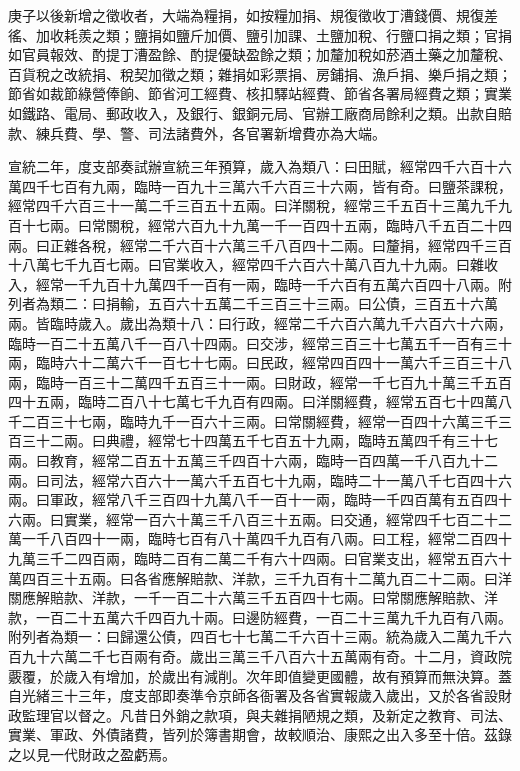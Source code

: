 \begin{pinyinscope}
庚子以後新增之徵收者，大端為糧捐，如按糧加捐、規復徵收丁漕錢價、規復差徭、加收耗羨之類；鹽捐如鹽斤加價、鹽引加課、土鹽加稅、行鹽口捐之類；官捐如官員報效、酌提丁漕盈餘、酌提優缺盈餘之類；加釐加稅如菸酒土藥之加釐稅、百貨稅之改統捐、稅契加徵之類；雜捐如彩票捐、房鋪捐、漁戶捐、樂戶捐之類；節省如裁節綠營俸餉、節省河工經費、核扣驛站經費、節省各署局經費之類；實業如鐵路、電局、郵政收入，及銀行、銀銅元局、官辦工廠商局餘利之類。出款自賠款、練兵費、學、警、司法諸費外，各官署新增費亦為大端。

宣統二年，度支部奏試辦宣統三年預算，歲入為類八：曰田賦，經常四千六百十六萬四千七百有九兩，臨時一百九十三萬六千六百三十六兩，皆有奇。曰鹽茶課稅，經常四千六百三十一萬二千三百五十五兩。曰洋關稅，經常三千五百十三萬九千九百十七兩。曰常關稅，經常六百九十九萬一千一百四十五兩，臨時八千五百二十四兩。曰正雜各稅，經常二千六百十六萬三千八百四十二兩。曰釐捐，經常四千三百十八萬七千九百七兩。曰官業收入，經常四千六百六十萬八百九十九兩。曰雜收入，經常一千九百十九萬四千一百有一兩，臨時一千六百有五萬六百四十八兩。附列者為類二：曰捐輸，五百六十五萬二千三百三十三兩。曰公債，三百五十六萬兩。皆臨時歲入。歲出為類十八：曰行政，經常二千六百六萬九千六百六十六兩，臨時一百二十五萬八千一百八十四兩。曰交涉，經常三百三十七萬五千一百有三十兩，臨時六十二萬六千一百七十七兩。曰民政，經常四百四十一萬六千三百三十八兩，臨時一百三十二萬四千五百三十一兩。曰財政，經常一千七百九十萬三千五百四十五兩，臨時二百八十七萬七千九百有四兩。曰洋關經費，經常五百七十四萬八千二百三十七兩，臨時九千一百六十三兩。曰常關經費，經常一百四十六萬三千三百三十二兩。曰典禮，經常七十四萬五千七百五十九兩，臨時五萬四千有三十七兩。曰教育，經常二百五十五萬三千四百十六兩，臨時一百四萬一千八百九十二兩。曰司法，經常六百六十一萬六千五百七十九兩，臨時二十一萬八千七百四十六兩。曰軍政，經常八千三百四十九萬八千一百十一兩，臨時一千四百萬有五百四十六兩。曰實業，經常一百六十萬三千八百三十五兩。曰交通，經常四千七百二十二萬一千八百四十一兩，臨時七百有八十萬四千九百有八兩。曰工程，經常二百四十九萬三千二四百兩，臨時二百有二萬二千有六十四兩。曰官業支出，經常五百六十萬四百三十五兩。曰各省應解賠款、洋款，三千九百有十二萬九百二十二兩。曰洋關應解賠款、洋款，一千一百二十六萬三千五百四十七兩。曰常關應解賠款、洋款，一百二十五萬六千四百九十兩。曰邊防經費，一百二十三萬九千九百有八兩。附列者為類一：曰歸還公債，四百七十七萬二千六百十三兩。統為歲入二萬九千六百九十六萬二千七百兩有奇。歲出三萬三千八百六十五萬兩有奇。十二月，資政院覈覆，於歲入有增加，於歲出有減削。次年即值變更國體，故有預算而無決算。蓋自光緒三十三年，度支部即奏準令京師各衙署及各省實報歲入歲出，又於各省設財政監理官以督之。凡昔日外銷之款項，與夫雜捐陋規之類，及新定之教育、司法、實業、軍政、外債諸費，皆列於簿書期會，故較順治、康熙之出入多至十倍。茲錄之以見一代財政之盈虧焉。


\end{pinyinscope}
